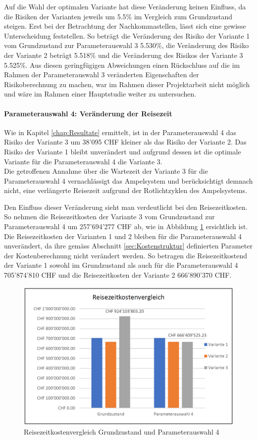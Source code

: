 Auf die Wahl der optimalen Variante hat diese Veränderung keinen Einfluss, da die Risiken der Varianten jeweils um 5.5\% im Vergleich zum Grundzustand steigen. Erst bei der Betrachtung der Nachkommastellen, lässt sich eine gewisse Unterscheidung feststellen. So beträgt die Veränderung des Risiko der Variante 1 vom Grundzustand zur Parameterauswahl 3 5.530\%, die Veränderung des Risiko der Variante 2 beträgt 5.518\% und die Veränderung des Risikos der Variante 3 5.525\%. Aus diesen geringfügigen Abweichungen einen Rückschluss auf die im Rahmen der Parameterauswahl 3 veränderten Eigenschaften der Risikoberechnung zu machen, war im Rahmen dieser Projektarbeit nicht möglich und wäre im Rahmen einer Hauptstudie weiter zu untersuchen.


\paragraph{Parameterauswahl 4: Veränderung der Reisezeit} 

Wie in Kapitel \ref{chap:Resultate} ermittelt, ist in der Parameterauswahl 4 das Risiko der Variante 3 um 38'095 CHF kleiner als das Risiko der Variante 2. Das Risiko der Variante 1 bleibt unverändert und aufgrund dessen ist die optimale Variante für die Parameterauswahl 4 die Variante 3. \\
Die getroffenen Annahme über die Wartezeit der Variante 3 für die Parameterauswahl 4 vernachlässigt das Ampelsystem und berücksichtigt demnach nicht, eine verlängerte Reisezeit aufgrund der Rotlichtzyklen des Ampelsystems. 

Den Einfluss dieser Veränderung sieht man verdeutlicht bei den Reisezeitkosten. So nehmen die Reisezeitkosten der Variante 3 vom Grundzustand zur Parameterauswahl 4 um 257'694'277 CHF ab, wie in Abbildung \ref{img:ReisezeitkostenZ0-Z4} ersichtlich ist. Die Reisezeitkosten der Varianten 1 und 2 bleiben für die Parameterauswahl 4 unverändert, da ihre gemäss Abschnitt \ref{sec:Kostenstruktur} definierten Parameter der Kostenberechnung nicht verändert werden. So betragen die Reisezeitkostend der Variante 1 sowohl im Grundzustand als auch für die Parameterauswahl 4 705'874'810 CHF und die Reisezeitkosten der Variante 2 666'890'370 CHF.


\begin{figure}[h!]
	\centering
	\includegraphics[width=.45\textwidth]{figures/f-06-06-ReisezeitVergleichZ0-Z4}
	\caption[Reisezeitkostenvergleich Grundzustand und Parameterauswahl 4]{Reisezeitkostenvergleich Grundzustand und Parameterauswahl 4}
	\label{img:ReisezeitkostenZ0-Z4}
\end{figure} 

